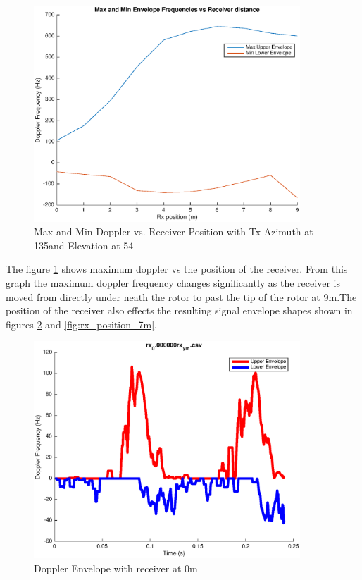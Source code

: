 \begin{figure}
	\begin{center}
		\includegraphics[width=10cm]{images/simulation/receiver_position_max_doppler.eps}
		\caption{Max and Min Doppler vs. Receiver Position with Tx Azimuth at 135\textdegree \space and Elevation at 54\textdegree}
		\label{fig:rx_position}
	\end{center}
\end{figure}

The figure \ref{fig:rx_position} shows maximum doppler vs the position of the receiver. From this graph the maximum doppler frequency changes significantly as the receiver is moved from directly under neath the rotor to past the tip of the rotor at 9m.The position of the receiver also effects the resulting signal envelope shapes shown in figures \ref{fig:rx_position_0m} and \ref{fig:rx_position_7m}.

\begin{figure}
	\begin{center}
		\includegraphics[width=10cm]{images/simulation/Doppler_Receiver_0m.eps}
		\caption{Doppler Envelope with receiver at 0m}
		\label{fig:rx_position_0m}
	\end{center}
\end{figure}

